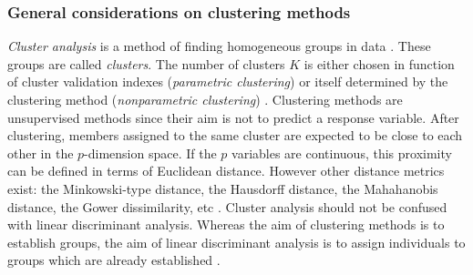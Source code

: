 \subsubsection{General considerations on clustering methods}
\emph{Cluster analysis} is a method of finding homogeneous groups in data \cite{kaufman_finding_1990}. These groups are called \emph{clusters}. The number of clusters $K$ is either chosen in function of cluster validation indexes (\emph{parametric clustering}) or itself determined by the clustering method (\emph{nonparametric clustering}) \cite{hennig_handbook_2016}. Clustering methods are unsupervised methods since their aim is not to predict a response variable. After clustering, members assigned to the same cluster are expected to be close to each other in the $p$-dimension space. If the $p$ variables are continuous, this proximity can be defined in terms of Euclidean distance. However other distance metrics exist: the Minkowski-type distance, the Hausdorff distance, the Mahahanobis distance, the Gower dissimilarity, etc \cite{hennig_handbook_2016}. Cluster analysis should not be confused with linear discriminant analysis. Whereas the aim of clustering methods is to establish groups, the aim of linear discriminant analysis is to assign individuals to groups which are already established \cite{hennig_handbook_2016,tille_multivariate_nodate}.

